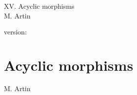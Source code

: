 \documentclass[10pt]{../fichiers-configuration-latex/smfart}
\begin{document}
\begin{center}
XV. Acyclic morphisms\\
M. Artin
\end{center}

version: \showgitstatus
\tableofcontents

\else
\chapter{Acyclic morphisms}
\begin{center}
M. Artin
\end{center}
\fi
{}\label{sga4.exp.XV}












\end{document}
